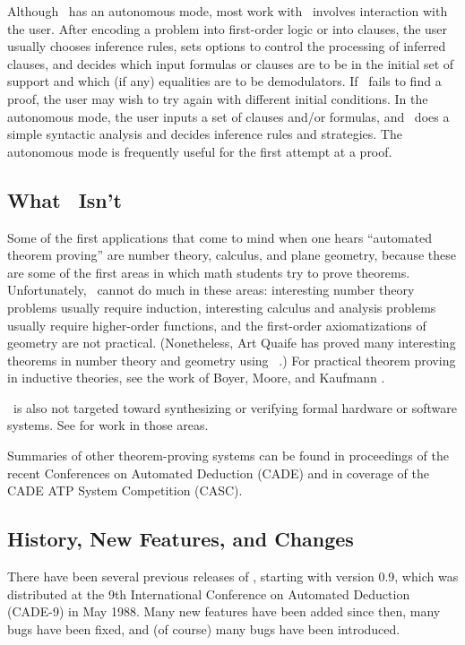 \documentclass[11pt]{article}
\begin{document}
Although \otter\ has an autonomous mode, most work with \otter\
involves interaction with the user.  After encoding a
problem into first-order logic or into clauses, the user usually
chooses inference rules, sets options to control the processing of
inferred clauses, and decides which input formulas or clauses are to be
in the initial set of support and which (if any) equalities are to be
demodulators.  If
\otter\ fails to find a proof, the user may wish to try again with
different initial conditions.  In the autonomous mode, the user inputs
a set of clauses and/or formulas, and \otter\ does a simple syntactic
analysis and decides inference rules and strategies.  The autonomous mode is
frequently useful for the first attempt at a proof.

\subsection{What \otter\ Isn't}

Some of the first applications that come to mind when one hears
``automated theorem proving'' are number theory, calculus, and
plane geometry, because these are some of the first areas in
which math students try to prove theorems.  Unfortunately,
\otter\ cannot do much in these areas: interesting number theory
problems usually require induction, interesting calculus and analysis
problems usually require higher-order functions, and the first-order
axiomatizations of geometry are not practical.  (Nonetheless, Art
Quaife has proved many interesting theorems in number theory and
geometry using \otter\ 
\cite{quaife-thesis,quaife-geo}.)  For practical theorem proving
in inductive theories, see the work of Boyer, Moore, and Kaufmann
\cite{boyer-moore-2,acl2-approach}.

\otter\ is also not targeted toward synthesizing or verifying formal
hardware or software systems.  See \cite{bm-verify,hw-verify}
for work in those areas.

Summaries of other theorem-proving systems can be found in proceedings
of the recent Conferences on Automated Deduction (CADE) and in
coverage of the CADE ATP System Competition (CASC).

\subsection{History, New Features, and Changes}

There have been several previous releases of \otter, starting with
version 0.9, which was distributed at the 9th International Conference
on Automated Deduction (CADE-9) in May 1988.  Many new features have
been added since then, many bugs have been fixed, and (of course) many
bugs have been introduced.
\end{document}
